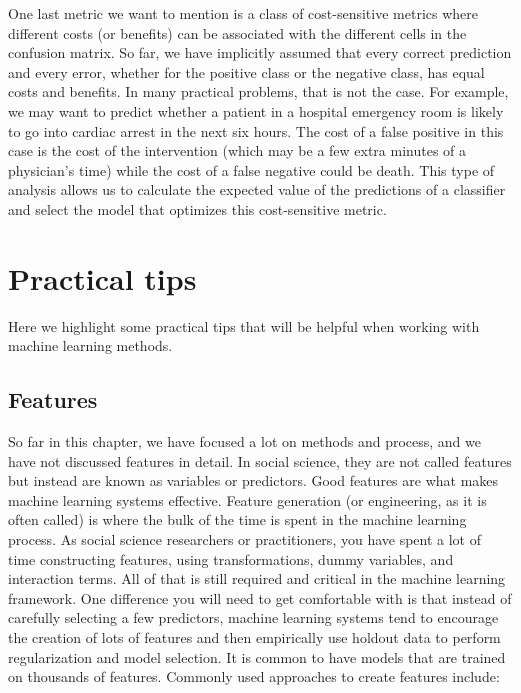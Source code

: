 \documentclass[]{krantz}
\begin{document}
\enlargethispage{6pt} One last metric we want to mention is a class of
cost-sensitive metrics where different costs (or benefits) can be
associated with the different cells in the confusion matrix. So far, we
have implicitly assumed that every correct prediction and every error,
whether for the positive class or the negative class, has equal costs
and benefits. In many practical problems, that is not the case. For
example, we may want to predict whether a patient in a hospital
emergency room is likely to go into cardiac arrest in the next six
hours. The cost of a false positive in this case is the cost of the
intervention (which may be a few extra minutes of a physician's time)
while the cost of a false negative could be death. This type of analysis
allows us to calculate the expected value of the predictions of a
classifier and select the model that optimizes this cost-sensitive
metric.

\section{Practical tips}\label{practical-tips}

Here we highlight some practical tips that will be helpful when working
with machine learning methods.

\subsection{Features}\label{features}

So far in this chapter, we have focused a lot on methods and process,
and we have not discussed features in detail. In social science, they
are not called features but instead are known as variables or
predictors. {Good features are what makes machine learning systems
effective}. Feature generation (or engineering, as it is often called)
is where the bulk of the time is spent in the machine learning process.
As social science researchers or practitioners, you have spent a lot of
time constructing features, using transformations, dummy variables, and
interaction terms. All of that is still required and critical in the
machine learning framework. One difference you will need to get
comfortable with is that instead of carefully selecting a few
predictors, machine learning systems tend to encourage the creation of
lots of features and then empirically use holdout data to perform
regularization and model selection. It is common to have models that are
trained on thousands of features. Commonly used approaches to create
features include:
\end{document}
